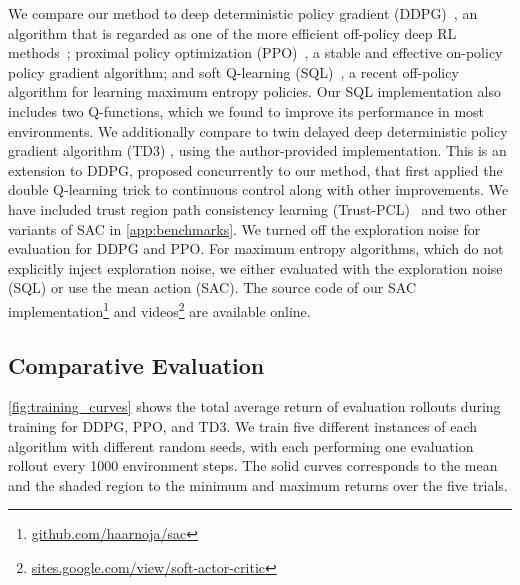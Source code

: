 \documentclass{article}
\begin{document}
We compare our method to deep deterministic policy gradient (DDPG)~\citep{lillicrap2015continuous}, an algorithm that is regarded as one of the more efficient off-policy deep RL methods~\citep{duan2016benchmarking}; proximal policy optimization (PPO)~\citep{schulman2017proximal}, a stable and effective on-policy policy gradient algorithm; and soft Q-learning (SQL)~\citep{haarnoja2017reinforcement}, a recent off-policy algorithm for learning maximum entropy policies. Our SQL implementation also includes two Q-functions, which we found to improve its performance in most environments. 
We additionally compare to twin delayed deep deterministic policy gradient algorithm (TD3) \citep{fujimoto2018addressing}, using the author-provided implementation. This is an extension to DDPG, proposed concurrently to our method, that first applied the double Q-learning trick to continuous control along with other improvements. We have included trust region path consistency learning (Trust-PCL)~\citep{nachum2017trust} and two other variants of SAC in \autoref{app:benchmarks}. We turned off the exploration noise for evaluation for DDPG and PPO. For maximum entropy algorithms, which do not explicitly inject exploration noise, we either evaluated with the exploration noise (SQL) or use the mean action (SAC). The source code of our SAC implementation\footnote{\href{http://github.com/haarnoja/sac}{github.com/haarnoja/sac}} and videos\footnote{\href{sites.google.com/view/soft-actor-critic}{sites.google.com/view/soft-actor-critic}} are available online.


\subsection{Comparative Evaluation}
\label{sec:evaluation}
\autoref{fig:training_curves} shows the total average return of evaluation rollouts during training for DDPG, PPO, and TD3. We train five different instances of each algorithm with different random seeds, with each performing one evaluation rollout every 1000 environment steps. The solid curves corresponds to the mean and the shaded region to the minimum and maximum returns over the five trials.
\end{document}
